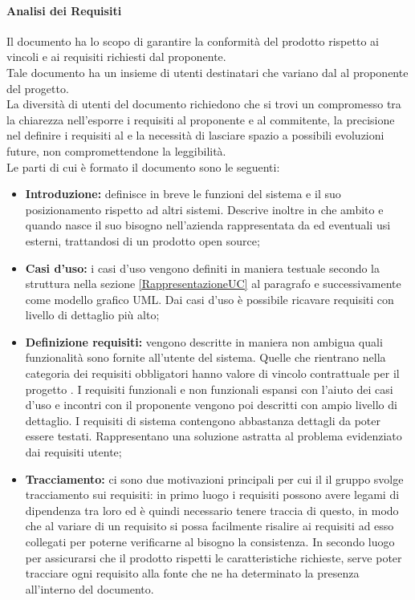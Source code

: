 \paragraph{Analisi dei Requisiti}
Il documento \docNameVersionAdR{} ha lo scopo di garantire la conformità del prodotto rispetto ai vincoli e ai requisiti richiesti dal proponente.\\
Tale documento ha un insieme di utenti destinatari che variano dal \roleDesigner{} al proponente del progetto.\\
La diversità di utenti del documento richiedono che si trovi un compromesso tra la chiarezza nell'esporre i requisiti al proponente e al commitente, la precisione nel definire i requisiti al \roleDesigner{} e la necessità di lasciare spazio a possibili evoluzioni future, non compromettendone la leggibilità.\\
Le parti di cui è formato il documento sono le seguenti:
\begin{itemize}
	\item \textbf{Introduzione:} definisce in breve le funzioni del sistema e il suo posizionamento rispetto ad altri sistemi. Descrive inoltre in che ambito e quando nasce il suo bisogno nell'azienda rappresentata da \proposerName{} ed eventuali usi esterni, trattandosi di un prodotto open source;
	\item \textbf{Casi d'uso:} i casi d'uso vengono definiti in maniera testuale secondo la struttura nella sezione \ref{RappresentazioneUC} al paragrafo  e successivamente come modello grafico UML.
	Dai casi d'uso è possibile ricavare requisiti con livello di dettaglio più alto;
	\item \textbf{Definizione requisiti:} vengono descritte in maniera non ambigua quali funzionalità sono fornite all'utente del sistema. Quelle che rientrano nella categoria dei requisiti obbligatori hanno valore di vincolo contrattuale per il progetto \projectName{}. I requisiti funzionali e non funzionali espansi con l'aiuto dei casi d'uso e incontri con il proponente vengono poi descritti con ampio livello di dettaglio. I requisiti di sistema contengono abbastanza dettagli da poter essere testati. Rappresentano una soluzione astratta al problema evidenziato dai requisiti utente;
	\item \textbf{Tracciamento:} ci sono due motivazioni principali per cui il il gruppo \groupName{} svolge tracciamento sui requisiti: in primo luogo i requisiti possono avere legami di dipendenza tra loro ed è quindi necessario tenere traccia di questo, in modo che al variare di un requisito si possa facilmente risalire ai requisiti ad esso collegati per poterne verificarne al bisogno la consistenza. In secondo luogo per assicurarsi che il prodotto rispetti le caratteristiche richieste, serve poter tracciare ogni requisito alla fonte che ne ha determinato la presenza all'interno del documento.
\end{itemize}


